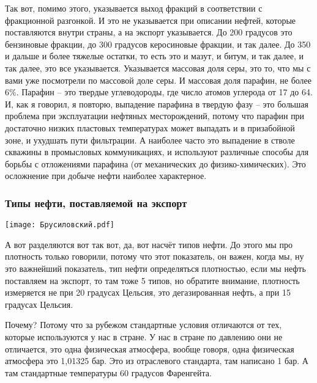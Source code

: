 \documentclass[main.tex]{subfiles}
\begin{document}
Так вот, помимо этого, указывается выход фракций в соответствии с фракционной разгонкой.
И это не указывается при описании нефтей, которые поставляются внутри страны, а на экспорт указывается.
До 200 градусов это бензиновые фракции, до 300 градусов керосиновые фракции, и так далее.
До 350 и дальше и более тяжелые остатки, то есть это и мазут, и битум, и так далее, и так далее, это все указывается.
Указывается массовая доля серы, это то, что мы с вами уже посмотрели по массовой доле серы.
И массовая доля парафин, не более 6\%.
Парафин -- это твердые углеводороды, где число атомов углерода от 17 до 64.
И, как я говорил, я повторю, выпадение парафина в твердую фазу -- это большая проблема при эксплуатации нефтяных месторождений, потому что парафин при достаточно низких пластовых температурах может выпадать и в призабойной зоне, и ухудшать пути фильтрации.
А наиболее часто это выпадение в стволе скважины в промысловых коммуникациях, и используют различные способы для борьбы с отложениями парафина (от механических до физико-химических).
Это осложнение при добыче нефти наиболее характерное.

\subsubsection{Типы нефти, поставляемой на экспорт}

\begin{center}
\texttt{[image: Брусиловский.pdf]}
\end{center}

А вот разделяются вот так вот, да, вот насчёт типов нефти.
До этого мы про плотность только говорили, потому что этот показатель, он важен, когда мы, ну это важнейший показатель, тип нефти определяться плотностью, если мы нефть поставляем на экспорт, то там тоже 5 типов, но обратите внимание, плотность измеряется не при 20 градусах Цельсия, это дегазированная нефть, а при 15 градусах Цельсия.

Почему? Потому что за рубежом стандартные условия отличаются от тех, которые используются у нас в стране.
У нас в стране по давлению они не отличается, это одна физическая атмосфера, вообще говоря, одна физическая атмосфера это 1,01325 бар.
Это из отраслевого стандарта, там написано 1 бар.
А там стандартные температуры 60 градусов Фаренгейта.
\end{document}
